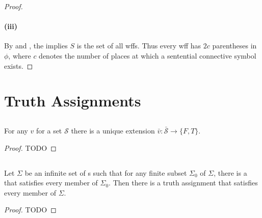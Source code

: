 \documentclass{report}
\begin{document}
\begin{proof}
    \paragraph{(iii)}%

      By  and
        , the
         implies $S$ is the set of all wffs.
      Thus every wff has $2c$ parentheses in $\phi$, where $c$ denotes the
        number of places at which a sentential connective symbol exists.

  \end{proof}

\section{Truth Assignments}%

\subsection{}%

  \begin{theorem}[12A]
    For any  $v$ for a set $\mathcal{S}$ there is
      a unique extension
      $\bar{v} \colon \bar{\mathcal{S}} \rightarrow \{F, T\}$.
  \end{theorem}

  \begin{proof}
    TODO
  \end{proof}

\subsection{}%

  \begin{theorem}
    Let $\Sigma$ be an infinite set of s such
      that for any finite subset $\Sigma_0$ of $\Sigma$, there is a
       that satisfies every member of $\Sigma_0$.
    Then there is a truth assignment that satisfies every member of $\Sigma$.
  \end{theorem}

  \begin{proof}
    TODO
  \end{proof}
\end{document}
